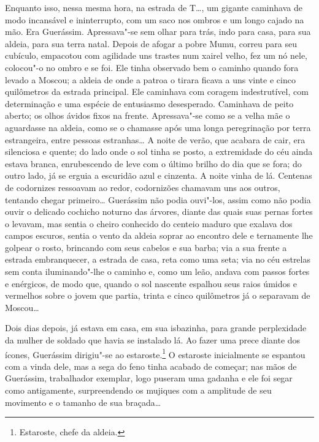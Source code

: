 Enquanto isso, nessa mesma hora, na estrada de T\ldots{}, um gigante
caminhava de modo incansável e ininterrupto, com um saco nos ombros e um
longo cajado na mão. Era Guerássim. Apressava"-se sem olhar para trás,
indo para casa, para sua aldeia, para sua terra natal. Depois de afogar
a pobre Mumu, correu para seu cubículo, empacotou com agilidade uns
trastes num xairel velho, fez um nó nele, colocou"-o no ombro e se foi.
Ele tinha observado bem o caminho quando fora levado a Moscou; a aldeia
de onde a patroa o tirara ficava a uns vinte e cinco quilômetros da
estrada principal. Ele caminhava com coragem indestrutível, com
determinação e uma espécie de entusiasmo desesperado. Caminhava de peito
aberto; os olhos ávidos fixos na frente. Apressava"-se como se a velha
mãe o aguardasse na aldeia, como se o chamasse após uma longa
peregrinação por terra estrangeira, entre pessoas estranhas\ldots{} A noite
de verão, que acabara de cair, era silenciosa e quente; do lado onde o
sol tinha se posto, a extremidade do céu ainda estava branca,
enrubescendo de leve com o último brilho do dia que se fora; do outro
lado, já se erguia a escuridão azul e cinzenta. A noite vinha de lá.
Centenas de codornizes ressoavam ao redor, codornizões chamavam uns aos
outros, tentando chegar primeiro\ldots{} Guerássim não podia ouvi"-los, assim
como não podia ouvir o delicado cochicho noturno das árvores, diante das
quais suas pernas fortes o levavam, mas sentia o cheiro conhecido do
centeio maduro que exalava dos campos escuros, sentia o vento da aldeia
soprar ao encontro dele e ternamente lhe golpear o rosto, brincando com
seus cabelos e sua barba; via a sua frente a estrada embranquecer, a
estrada de casa, reta como uma seta; via no céu estrelas sem conta
iluminando"-lhe o caminho e, como um leão, andava com passos fortes e
enérgicos, de modo que, quando o sol nascente espalhou seus raios úmidos
e vermelhos sobre o jovem que partia, trinta e cinco quilômetros já o
separavam de Moscou\ldots{}

Dois dias depois, já estava em casa, em sua isbazinha, para grande
perplexidade da mulher de soldado que havia se instalado lá. Ao fazer
uma prece diante dos ícones, Guerássim dirigiu"-se ao
estaroste.\footnote{Estaroste, chefe da aldeia.} O estaroste
inicialmente se espantou com a vinda dele, mas a sega do feno tinha
acabado de começar; nas mãos de Guerássim, trabalhador exemplar, logo
puseram uma gadanha e ele foi segar como antigamente, surpreendendo os
mujiques com a amplitude de seu movimento e o tamanho de sua braçada\ldots{}

